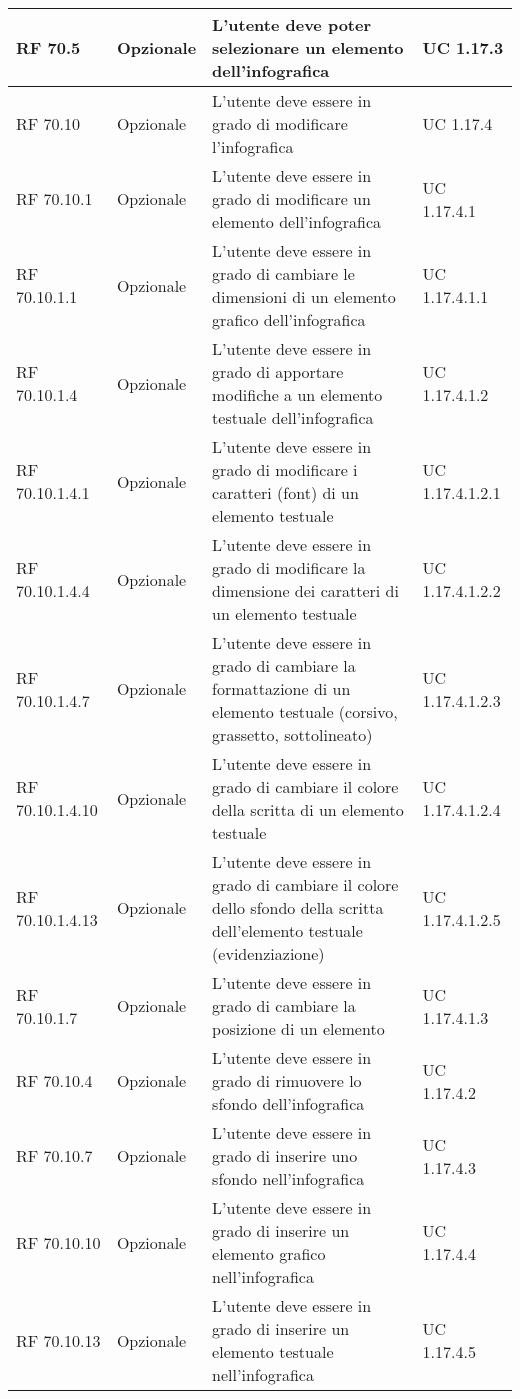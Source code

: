 {\begin{longtable} [c]{| p{2.5cm} | p{2.5cm} | p{6cm} |p{2.5cm}|}
 \hline 
RF 70.5 & Opzionale & L'utente deve poter selezionare un elemento dell'infografica & UC 1.17.3\\ 
 \hline 
RF 70.10 & Opzionale & L'utente deve essere in grado di modificare l'infografica & UC 1.17.4\\ 
 \hline 
RF 70.10.1 & Opzionale & L'utente deve essere in grado di modificare un elemento dell'infografica & UC 1.17.4.1\\ 
 \hline 
RF 70.10.1.1 & Opzionale & L'utente deve essere in grado di cambiare le dimensioni di un elemento grafico dell'infografica & UC 1.17.4.1.1\\ 
 \hline 
RF 70.10.1.4 & Opzionale & L'utente deve essere in grado di apportare modifiche a un elemento testuale dell'infografica & UC 1.17.4.1.2\\ 
 \hline 
RF 70.10.1.4.1 & Opzionale & L'utente deve essere in grado di modificare i caratteri (font) di un elemento testuale & UC 1.17.4.1.2.1\\ 
 \hline 
RF 70.10.1.4.4 & Opzionale & L'utente deve essere in grado di modificare la dimensione dei caratteri di un elemento testuale & UC 1.17.4.1.2.2\\ 
 \hline 
RF 70.10.1.4.7 & Opzionale & L'utente deve essere in grado di cambiare la formattazione di un elemento testuale (corsivo, grassetto, sottolineato) & UC 1.17.4.1.2.3\\ 
 \hline 
RF 70.10.1.4.10 & Opzionale & L'utente deve essere in grado di cambiare il colore della scritta di un elemento testuale & UC 1.17.4.1.2.4\\ 
 \hline 
RF 70.10.1.4.13 & Opzionale & L'utente deve essere in grado di cambiare il colore dello sfondo della scritta dell'elemento testuale (evidenziazione) & UC 1.17.4.1.2.5\\ 
 \hline 
RF 70.10.1.7 & Opzionale & L'utente deve essere in grado di cambiare la posizione di un elemento & UC 1.17.4.1.3\\ 
 \hline 
RF 70.10.4 & Opzionale & L'utente deve essere in grado di rimuovere lo sfondo dell'infografica & UC 1.17.4.2\\ 
 \hline 
RF 70.10.7 & Opzionale & L'utente deve essere in grado di inserire uno sfondo nell'infografica & UC 1.17.4.3\\ 
 \hline 
RF 70.10.10 & Opzionale & L'utente deve essere in grado di inserire un elemento grafico nell'infografica & UC 1.17.4.4\\ 
 \hline 
RF 70.10.13 & Opzionale & L'utente deve essere in grado di inserire un elemento testuale nell'infografica & UC 1.17.4.5\\ 

\end{longtable}}
